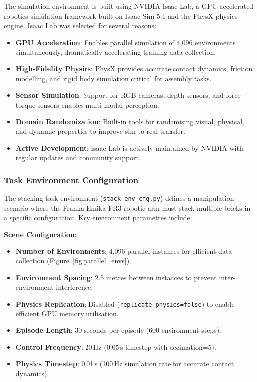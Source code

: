 \documentclass[12pt,a4paper,oneside]{report}
\begin{document}
The simulation environment is built using NVIDIA Isaac Lab, a GPU-accelerated robotics simulation framework built on Isaac Sim 5.1 and the PhysX physics engine. Isaac Lab was selected for several reasons:
\begin{itemize}
    \item \textbf{GPU Acceleration}: Enables parallel simulation of 4{,}096 environments simultaneously, dramatically accelerating training data collection.
    \item \textbf{High-Fidelity Physics}: PhysX provides accurate contact dynamics, friction modelling, and rigid body simulation critical for assembly tasks.
    \item \textbf{Sensor Simulation}: Support for RGB cameras, depth sensors, and force-torque sensors enables multi-modal perception.
    \item \textbf{Domain Randomization}: Built-in tools for randomising visual, physical, and dynamic properties to improve sim-to-real transfer.
    \item \textbf{Active Development}: Isaac Lab is actively maintained by NVIDIA with regular updates and community support.
\end{itemize}

\subsubsection{Task Environment Configuration}

The stacking task environment (\texttt{stack\_env\_cfg.py}) defines a manipulation scenario where the Franka Emika FR3 robotic arm must stack multiple bricks in a specific configuration. Key environment parametres include:

\textbf{Scene Configuration:}
\begin{itemize}
    \item \textbf{Number of Environments}: 4{,}096 parallel instances for efficient data collection (Figure~\ref{fig:parallel_envs}).
    \item \textbf{Environment Spacing}: 2.5 metres between instances to prevent inter-environment interference.
    \item \textbf{Physics Replication}: Disabled (\texttt{replicate\_physics=false}) to enable efficient GPU memory utilisation.
    \item \textbf{Episode Length}: 30 seconds per episode (600 environment steps).
    \item \textbf{Control Frequency}: 20\,Hz (0.05\,s timestep with decimation=5).
    \item \textbf{Physics Timestep}: 0.01\,s (100\,Hz simulation rate for accurate contact dynamics).
\end{itemize}
\end{document}
